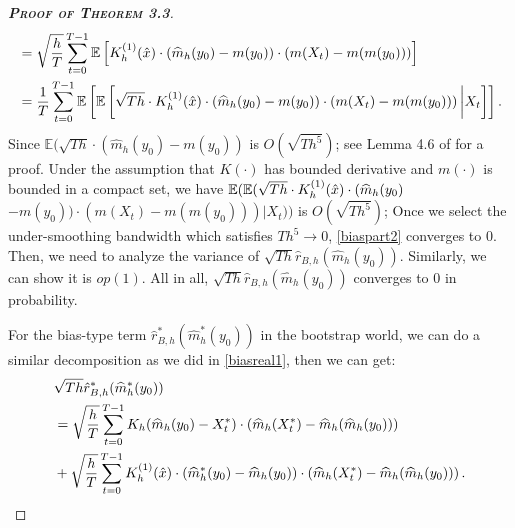 \documentclass[a4paper]{article}
\begin{document}
\begin{proof}[\textbf{\textsc{Proof of Theorem 3.3}}]
\begin{equation}
\begin{split}
    &= \sqrt{\frac{h}{T}}\sum_{t=0}^{T-1}\mathbb{E}\left[ K^{(1)}_h(\Hat{x})\cdot (\widehat{m}_{h}(y_0) - m(y_0)) \cdot\left(m(X_t) -  m(m(y_0))    \right)  \right] \\
    & = \frac{1}{T}\sum_{t=0}^{T-1}\mathbb{E}\left[\mathbb{E}\left[\sqrt{Th}\cdot K^{(1)}_h(\Hat{x})\cdot (\widehat{m}_{h}(y_0) - m(y_0)) \cdot\left(m(X_t) -  m(m(y_0))    \right) \bigg\vert X_t  \right]\right].
\end{split}
\end{equation}
Since $\mathbb{E}(\sqrt{Th}\cdot (\widehat{m}_{h}(y_0) -  m(y_0) )$ is $O(\sqrt{Th^5})$; see Lemma 4.6 of \cite{franke2002bootstrap} for a proof. Under the assumption that $K(\cdot)$ has bounded derivative and $m(\cdot)$ is bounded in a compact set, we have $\mathbb{E}(\mathbb{E}(\sqrt{Th}\cdot K^{(1)}_h(\Hat{x})\cdot (\widehat{m}_{h}(y_0) $$- m(y_0)) \cdot\left(m(X_t) -  m(m(y_0)) \right) \vert X_t ))$ is $O(\sqrt{Th^5})$; Once we select the under-smoothing bandwidth which satisfies $Th^5 \to 0$, \cref{biaspart2} converges to 0. Then, we need to analyze the variance of $\sqrt{Th}\hat{r}_{B,h}(\widehat{m}_h(y_0))$. Similarly, we can show it is $op(1)$. All in all, $\sqrt{Th}\hat{r}_{B,h}(\widehat{m}_h(y_0))$ converges to 0 in probability.

For the bias-type term $\hat{r}^*_{B,h}(\widehat{m}^*_{h}(y_0))$ in the bootstrap world, we can do a similar decomposition as we did in \cref{biasreal1}, then we can get:
\begin{equation}\label{biasboot1}
\begin{split}
    &\sqrt{Th}\hat{r}^*_{B,h}(\widehat{m}^*_h(y_0)) \\
    & =   \sqrt{\frac{h}{T}}\sum_{t=0}^{T-1}K_h(\widehat{m}_{h}(y_0)- X^*_t)\cdot\left(\widehat{m}_h(X^*_t) -  \widehat{m}_h(\widehat{m}_h(y_0))    \right)    \\
    & + \sqrt{\frac{h}{T}}\sum_{t=0}^{T-1}K^{(1)}_h(\Hat{x})\cdot (\widehat{m}^*_{h}(y_0) - \widehat{m}_h(y_0)) \cdot\left(\widehat{m}_h(X^*_t) -  \widehat{m}_h(\widehat{m}_h(y_0))    \right).   \\
\end{split}
\end{equation}



\end{proof}
\end{document}
